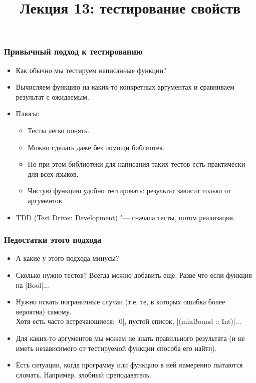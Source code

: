 \documentclass[11pt]{beamer}
\title{Лекция 13: тестирование свойств}
\begin{document}
\begin{frame}[plain]
  \maketitle
\end{frame}

\begin{frame}[fragile]
  \frametitle{Привычный подход к тестированию}
  \begin{itemize}
    \item Как обычно мы тестируем написанные функции?
          \pause
    \item Вычисляем функцию на каких-то конкретных аргументах и сравниваем результат с ожидаемым.
    \item Плюсы:
          \pause
          \begin{itemize}
            \item Тесты легко понять.
            \item Можно сделать даже без помощи библиотек.
            \item Но при этом библиотеки для написания таких тестов есть практически для всех языков.
            \item Чистую функцию удобно тестировать: результат зависит только от аргументов.
          \end{itemize}
          \pause
    \item TDD (Test Driven Development) \pause "--- сначала тесты, потом реализация.
  \end{itemize}
\end{frame}

\begin{frame}[fragile]
  \frametitle{Недостатки этого подхода}
  \begin{itemize}
    \item А какие у этого подхода минусы?
          \pause
    \item Сколько нужно тестов? Всегда можно добавить ещё.
          \pause
          Разве что если функция на \haskinline|Bool|...
          \pause
    \item Нужно искать пограничные случаи (т.е. те, в которых ошибка более вероятна) самому. \\
          Хотя есть часто встречающиеся: \pause \haskinline|0|, пустой список, \haskinline|(minBound :: Int)|...
          \pause
    \item Для каких-то аргументов мы можем не знать правильного результата (и не иметь независимого от тестируемой функции способа его найти).
          \pause
    \item Есть ситуации, когда программу или функцию в ней намеренно пытаются сломать. \pause Например, злобный преподаватель.
  \end{itemize}
\end{frame}
\end{document}
